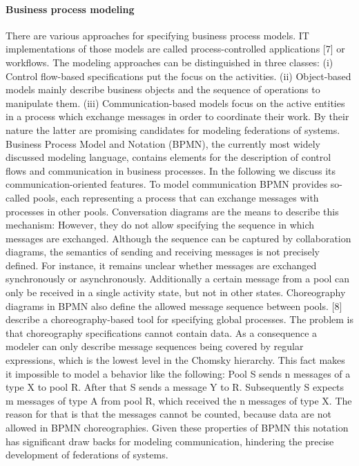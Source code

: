 \paragraph{Business process modeling} 
There are various approaches for specifying business process models. IT implementations of those models are called process-controlled applications [7] or workflows. The modeling approaches can be distinguished in three classes: (i) Control flow-based specifications put the focus on the activities. (ii) Object-based models mainly describe business objects and the sequence of operations to manipulate them. (iii) Communication-based models focus on the active entities in a process which exchange messages in order to coordinate their work.
By their nature the latter are promising candidates for modeling federations of systems. Business Process Model and Notation (BPMN), the currently most widely discussed modeling language, contains elements for the description of control flows and communication in business processes. In the following we discuss its communication-oriented features.
To model communication BPMN provides so-called pools, each representing a process that can exchange messages with processes in other pools. Conversation diagrams are the means to describe this mechanism: However, they do not allow specifying the sequence in which messages are exchanged. Although the sequence can be captured by collaboration diagrams, the semantics of sending and receiving messages is not precisely defined. For instance, it remains unclear whether messages are exchanged synchronously or asynchronously. Additionally a certain message from a pool can only be received in a single activity state, but not in other states. Choreography diagrams in BPMN also define the allowed message sequence between pools. [8] describe a choreography-based tool for specifying global processes. The problem is that choreography specifications cannot contain data. As a consequence a modeler can only describe message sequences being covered by regular expressions, which is the lowest level in the Chomsky hierarchy. This fact makes it impossible to model a behavior like the following: Pool S sends n messages of a type X to pool R. After that S sends a message Y to R. Subsequently S expects m messages of type A from pool R, which received the n messages of type X. The reason for that is that the messages cannot be counted, because data are not allowed in BPMN choreographies.
Given these properties of BPMN this notation has significant draw backs for modeling communication, hindering the precise development of federations of systems.

